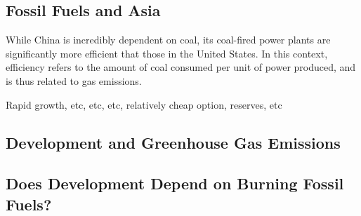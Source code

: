 \subsection{Fossil Fuels and Asia}

While China is incredibly dependent on coal, its coal-fired power plants are significantly more efficient that those in the United States. In this context, efficiency refers to the amount of coal consumed per unit of power produced, and is thus related to gas emissions. 

Rapid growth, etc, etc, etc, relatively cheap option, reserves, etc

\subsection{Development and Greenhouse Gas Emissions}

\subsection{Does Development Depend on Burning Fossil Fuels?}






